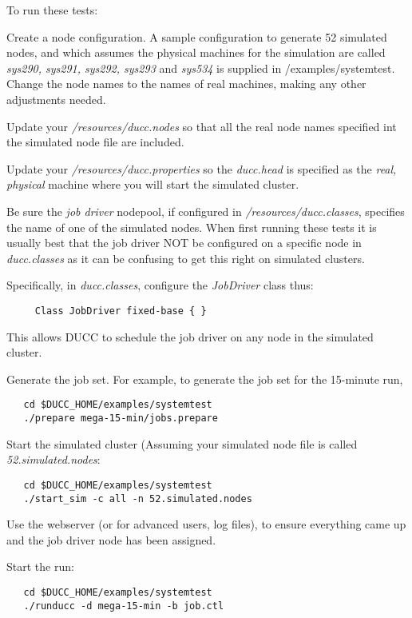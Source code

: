      To run these tests:
     \begin{enumerate}

       \begin{sloppypar}
       \item Create a node configuration.  A sample configuration to generate
         52 simulated nodes, and which assumes the
         physical machines for the simulation are called {\em sys290, sys291, sys292, sys293}
         and {\em sys534} is supplied in \duccruntime/examples/systemtest. Change
         the node names to the names of real machines, making any other adjustments
         needed.
       \end{sloppypar}
       
       \item Update your {\em \duccruntime/resources/ducc.nodes} so that all the real node names specified
         int the simulated node file are included.
       \item Update your {\em \duccruntime/resources/ducc.properties} so the 
         {\em ducc.head} is specified as the {\em real, physical} machine where you will
         start the simulated cluster.
       \item Be sure the {\em job driver} nodepool, if configured in
         {\em \duccruntime/resources/ducc.classes}, specifies the name of one of the
         simulated nodes.  When first running these tests it is usually best that
         the job driver NOT be configured on a specific node in {\em ducc.classes}
         as it can be confusing to get this right on simulated clusters.

         Specifically, in {\em ducc.classes}, configure the {\em JobDriver} class
         thus:
\begin{verbatim}
     Class JobDriver fixed-base { }
\end{verbatim}
         This allows DUCC to schedule the job driver on any node in the simulated
         cluster.
        
       \item Generate the job set.  For example, to generate the job set for the
         15-minute run,
\begin{verbatim}
   cd $DUCC_HOME/examples/systemtest
   ./prepare mega-15-min/jobs.prepare
\end{verbatim}
         \item Start the simulated cluster (Assuming your simulated node file is called
           {\em 52.simulated.nodes}:
\begin{verbatim}
   cd $DUCC_HOME/examples/systemtest
   ./start_sim -c all -n 52.simulated.nodes
\end{verbatim}
         \item Use the webserver (or for advanced users, log files), to ensure
           everything came up and the job driver node has been assigned.
         \item Start the run:
\begin{verbatim}
   cd $DUCC_HOME/examples/systemtest
   ./runducc -d mega-15-min -b job.ctl
\end{verbatim}             
         \end{enumerate}
     
